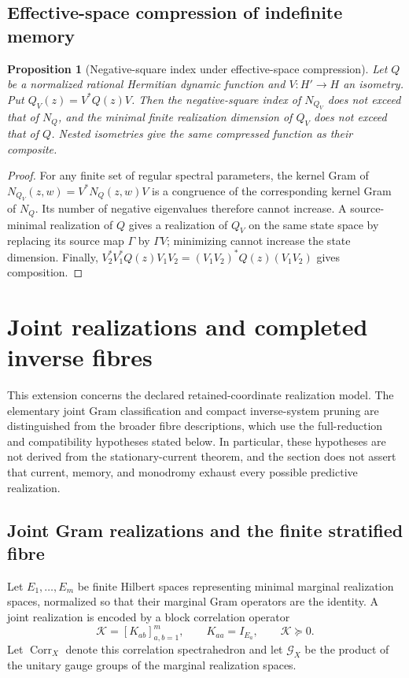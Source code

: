 \documentclass[11pt]{article}
\newtheorem{proposition}[proposition]{Proposition}
\theoremstyle{definition}
\theoremstyle{remark}
\theoremstyle{definition}
\theoremstyle{remark}
\newcommand{\Corr}{\operatorname{Corr}}
\begin{document}
\subsection{Effective-space compression of indefinite memory}

\begin{proposition}[Negative-square index under effective-space compression]
\label{prop:extension-indefinite-compression}
Let $Q$ be a normalized rational Hermitian dynamic function and
$V:H'\to H$ an isometry.  Put $Q_V(z)=V^*Q(z)V$.
Then the negative-square index of $N_{Q_V}$ does not exceed that of $N_Q$,
and the minimal finite realization dimension of $Q_V$ does not exceed that
of $Q$.  Nested isometries give the same compressed function as their composite.
\end{proposition}

\begin{proof}
For any finite set of regular spectral parameters, the kernel Gram of
$N_{Q_V}(z,w)=V^*N_Q(z,w)V$ is a congruence of the corresponding kernel Gram
of $N_Q$.  Its number of negative eigenvalues therefore cannot increase.
A source-minimal realization of $Q$ gives a realization of $Q_V$ on the same
state space by replacing its source map $\Gamma$ by $\Gamma V$; minimizing
cannot increase the state dimension.  Finally,
$V_2^*V_1^*Q(z)V_1V_2=(V_1V_2)^*Q(z)(V_1V_2)$ gives composition.
\end{proof}

\section{Joint realizations and completed inverse fibres}
\label{app:completed-fibres}

This extension concerns the declared retained-coordinate realization model.
The elementary joint Gram classification and compact inverse-system pruning
are distinguished from the broader fibre descriptions, which use the
full-reduction and compatibility hypotheses stated below.  In particular,
these hypotheses are not derived from the stationary-current theorem, and the
section does not assert that current, memory, and monodromy exhaust every
possible predictive realization.

\subsection{Joint Gram realizations and the finite stratified fibre}

Let $E_1,\ldots,E_m$ be finite Hilbert spaces representing minimal marginal
realization spaces, normalized so that their marginal Gram operators are the
identity.  A joint realization is encoded by a block correlation operator
\begin{equation}
\mathcal K=[K_{ab}]_{a,b=1}^m,
\qquad
K_{aa}=I_{E_a},
\qquad
\mathcal K\succeq0.
\label{eq:supp-correlation-spectrahedron}
\end{equation}
Let $\Corr_X$ denote this correlation spectrahedron and let $\mathcal G_X$ be
the product of the unitary gauge groups of the marginal realization spaces.
\end{document}
